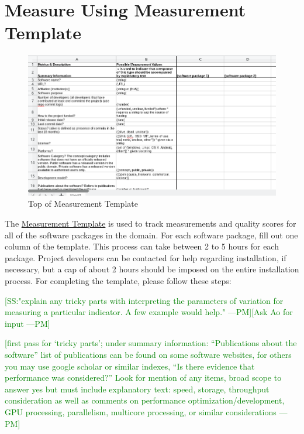 \documentclass[letterpaper,cleveref]{lipics-v2019}
\newcommand{\authornote}[3]{\textcolor{#1}{[#3 ---#2]}}
\newcommand{\authornote}[3]{}
\newcommand{\pmi}[1]{\authornote{green}{PM}{#1}} %
\theoremstyle{definition}
\begin{document}
\section{Measure Using Measurement Template} \label{SecShallowMeasure}

\begin{figure}[h!]
	\begin{center}
		\includegraphics[width=1.0\textwidth]{measurement_template}
		\caption{Top of Measurement Template}
		\label{measurement_template_image}

	\end{center}
\end{figure}

The \href{https://github.com/smiths/AIMSS/blob/master/StateOfPractice/Methodology/Combined_MeasurementTemplate_EmpiricalMeasures.xlsx}{Measurement Template} is used to track measurements and quality scores for all of the software packages in the domain. For each software package, fill out one column of the template. This process can take between 2 to 5 hours for each package.
Project developers can be contacted for help regarding installation, if necessary, but a cap of about 2 hours should be imposed on the entire installation process. For completing the template, please follow these steps:

\pmi{SS:"explain any tricky parts with interpreting the parameters of variation for measuring a particular indicator. A few example would help."}\pmi{Ask Ao for input}

\pmi{first pass for `tricky parts'; under summary information:
	``Publications about the software''
	list of publications can be found on some software websites, for others you may use google scholar or similar indexes,
	``Is there evidence that performance was considered?''	Look for mention of any items, broad scope to answer yes but must include explanatory text: speed, storage, throughput consideration as well as comments on performance optimization/development, GPU processing, parallelism, multicore processing, or similar considerations}
\end{document}
